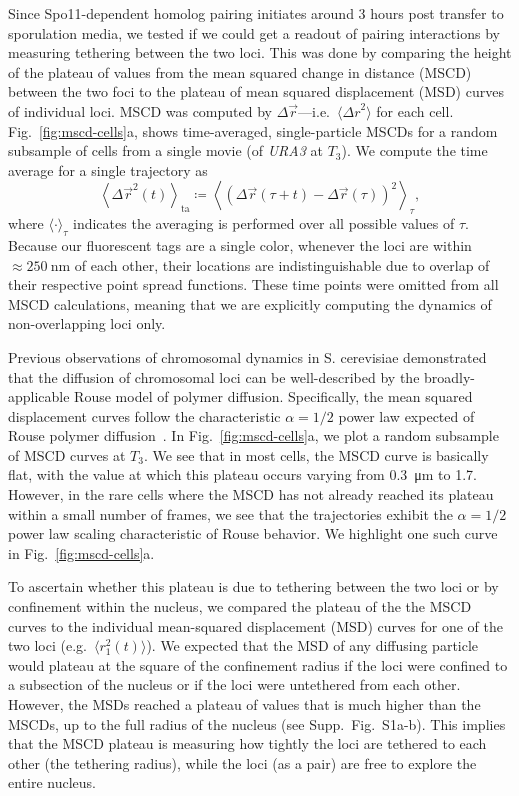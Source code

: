 \documentclass[9pt,twocolumn,twoside,lineno]{pnas-new}
\begin{document}
Since Spo11-dependent homolog pairing initiates around 3 hours post transfer to sporulation media, we tested if we could get a readout of pairing interactions by measuring tethering between the two loci. This was done by comparing the height of the plateau of values from the mean squared change in distance (MSCD) between the two foci to the plateau of mean squared displacement (MSD) curves of individual loci. MSCD was computed by  $\Delta{}\vec{r}$---i.e.\ $\langle {\Delta{}r}^2 \rangle$ for each cell.
Fig.~\ref{fig:mscd-cells}a, shows time-averaged, single-particle MSCDs for a random subsample of cells from a single movie (of \textit{URA3} at $T_3$). We compute the time average for a single trajectory as
\[ \left\langle\Delta{}\vec{r}^2(t)\right\rangle_\text{ta}
 \coloneqq \left\langle \left(\Delta{}\vec{r}(\tau + t) - \Delta{}\vec{r}(\tau)\right)^2 \right\rangle_\tau, \]
where $\langle\cdot\rangle_\tau$ indicates the averaging is performed over all possible values of $\tau$.
Because our fluorescent tags are a single color, whenever the loci are within $\approx\SI{250}{\nano\meter}$ of each other, their locations are indistinguishable due to overlap of their respective point spread functions. These time points were omitted from all MSCD calculations, meaning that we are explicitly computing the dynamics of non-overlapping loci only.


Previous observations of chromosomal dynamics in S. cerevisiae demonstrated that the diffusion of chromosomal loci can be well-described by the broadly-applicable Rouse model of polymer diffusion. Specifically,  the mean squared displacement curves follow the characteristic $\alpha = 1/2$ power law expected of Rouse polymer diffusion~\cite{weber2010}. In Fig.~\ref{fig:mscd-cells}a, we plot a random subsample of MSCD curves at $T_3$. We see that in most cells, the MSCD curve is basically flat, with the value at which this plateau occurs varying from \SI{0.3}{\micro\meter} to \SI{1.7}{\micrometer}. However, in the rare cells where the MSCD has not already reached its plateau within a small number of frames, we see that the trajectories exhibit the $\alpha = 1/2$ power law scaling characteristic of Rouse behavior. We highlight one such curve in Fig.~\ref{fig:mscd-cells}a.

To ascertain whether this plateau is due to tethering between the two loci or by confinement within the nucleus, we compared the plateau of the the MSCD curves to the individual mean-squared displacement (MSD) curves for one of the two loci (e.g.\ $\langle r_1^2 (t) \rangle$).
We expected that the MSD of any diffusing particle would plateau at the square of the confinement radius if the loci were confined to a subsection of the nucleus or if the loci were untethered from each other. However, the MSDs reached a plateau of values that  is much higher than the MSCDs, up to the full radius of the nucleus (see Supp.\ Fig.\ S1a-b).
This implies that the MSCD plateau is measuring how tightly the loci are tethered to each other (the tethering radius), while the loci (as a pair) are free to explore the entire nucleus.
\end{document}
